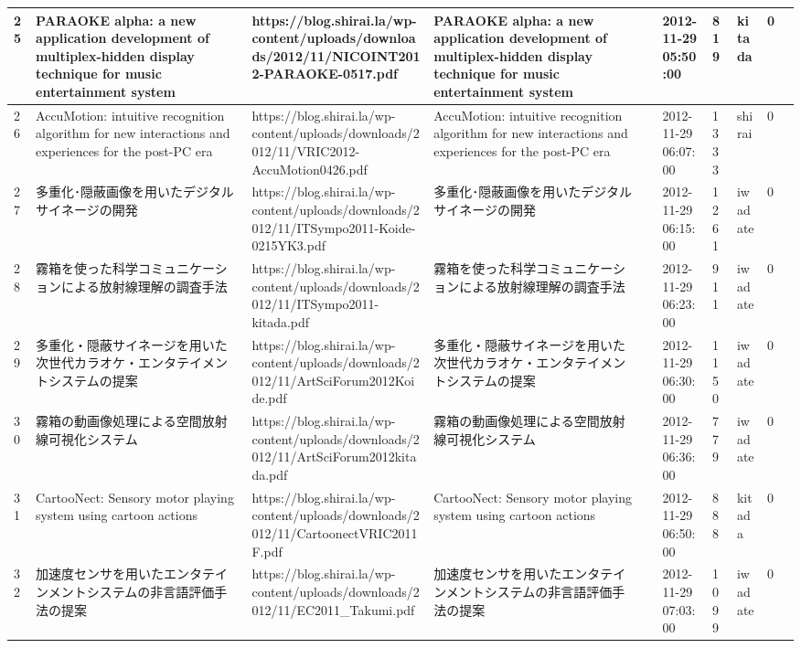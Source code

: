 \begin{longtable}{|l|l|l|l|l|l|l|l|l|l|}
25 & PARAOKE alpha: a new application development of multiplex-hidden display technique for music entertainment system & https://blog.shirai.la/wp-content/uploads/downloads/2012/11/NICOINT2012-PARAOKE-0517.pdf & PARAOKE alpha: a new application development of multiplex-hidden display technique for music entertainment system &  & 2012-11-29 05:50:00 & 819 & kitada & 0 &  \\ \hline 
26 & AccuMotion: intuitive recognition algorithm for new interactions and experiences for the post-PC era & https://blog.shirai.la/wp-content/uploads/downloads/2012/11/VRIC2012-AccuMotion0426.pdf & AccuMotion: intuitive recognition algorithm for new interactions and experiences for the post-PC era &  & 2012-11-29 06:07:00 & 1333 & shirai & 0 &  \\ \hline 
27 & 多重化･隠蔽画像を用いたデジタルサイネージの開発 & https://blog.shirai.la/wp-content/uploads/downloads/2012/11/ITSympo2011-Koide-0215YK3.pdf & 多重化･隠蔽画像を用いたデジタルサイネージの開発 &  & 2012-11-29 06:15:00 & 1261 & iwadate & 0 &  \\ \hline 
28 & 霧箱を使った科学コミュニケーションによる放射線理解の調査手法 & https://blog.shirai.la/wp-content/uploads/downloads/2012/11/ITSympo2011-kitada.pdf & 霧箱を使った科学コミュニケーションによる放射線理解の調査手法 &  & 2012-11-29 06:23:00 & 911 & iwadate & 0 &  \\ \hline 
29 & 多重化・隠蔽サイネージを用いた次世代カラオケ・エンタテイメントシステムの提案 & https://blog.shirai.la/wp-content/uploads/downloads/2012/11/ArtSciForum2012Koide.pdf & 多重化・隠蔽サイネージを用いた次世代カラオケ・エンタテイメントシステムの提案 &  & 2012-11-29 06:30:00 & 1150 & iwadate & 0 &  \\ \hline 
30 & 霧箱の動画像処理による空間放射線可視化システム & https://blog.shirai.la/wp-content/uploads/downloads/2012/11/ArtSciForum2012kitada.pdf & 霧箱の動画像処理による空間放射線可視化システム &  & 2012-11-29 06:36:00 & 779 & iwadate & 0 &  \\ \hline 
31 & CartooNect: Sensory motor playing system using cartoon actions & https://blog.shirai.la/wp-content/uploads/downloads/2012/11/CartoonectVRIC2011F.pdf & CartooNect: Sensory motor playing system using cartoon actions &  & 2012-11-29 06:50:00 & 888 & kitada & 0 &  \\ \hline 
32 & 加速度センサを用いたエンタテインメントシステムの非言語評価手法の提案 & https://blog.shirai.la/wp-content/uploads/downloads/2012/11/EC2011\_Takumi.pdf & 加速度センサを用いたエンタテインメントシステムの非言語評価手法の提案 &  & 2012-11-29 07:03:00 & 1099 & iwadate & 0 &  \\ \hline 

\end{longtable}
